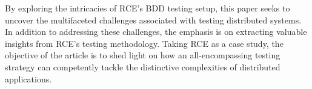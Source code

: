 By exploring the intricacies of \ac{RCE}'s BDD testing setup, this paper seeks to uncover the multifaceted challenges associated with testing distributed systems. In addition to addressing these challenges, the emphasis is on extracting valuable insights from \ac{RCE}'s testing methodology. Taking \ac{RCE} as a case study, the objective of the article is to shed light on how an all-encompassing testing strategy can competently tackle the distinctive complexities of distributed applications. 
